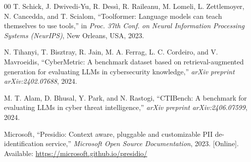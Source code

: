 \documentclass[conference]{IEEEtran}
\begin{document}
\begin{thebibliography}{00}
T. Schick, J. Dwivedi-Yu, R. Dess\`i, R. Raileanu, M. Lomeli,
L. Zettlemoyer, N. Cancedda, and T. Scialom,
``Toolformer: Language models can teach themselves to use tools,''
in \textit{Proc. 37th Conf. on Neural Information Processing Systems
(NeurIPS)},
New Orleans, USA, 2023.

N. Tihanyi, T. Bisztray, R. Jain, M. A. Ferrag, L. C. Cordeiro,
and V. Mavroeidis,
``CyberMetric: A benchmark dataset based on retrieval-augmented
generation for evaluating LLMs in cybersecurity knowledge,''
\textit{arXiv preprint arXiv:2402.07688}, 2024.

M. T. Alam, D. Bhusal, Y. Park, and N. Rastogi,
``CTIBench: A benchmark for evaluating LLMs in cyber threat
intelligence,''
\textit{arXiv preprint arXiv:2406.07599}, 2024.

Microsoft,
``Presidio: Context aware, pluggable and customizable PII
de-identification service,''
\textit{Microsoft Open Source Documentation}, 2023.
[Online]. Available: \url{https://microsoft.github.io/presidio/}

\end{thebibliography}
\end{document}
